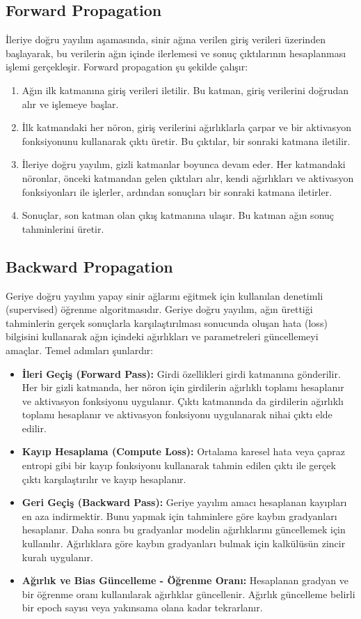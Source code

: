 \subsection{Forward Propagation}
İleriye doğru yayılım aşamasında, sinir ağına verilen giriş verileri üzerinden başlayarak, bu verilerin ağın içinde ilerlemesi ve sonuç çıktılarının hesaplanması işlemi gerçekleşir. Forward propagation şu şekilde çalışır:
\begin{enumerate}
    \item Ağın ilk katmanına giriş verileri iletilir. Bu katman, giriş verilerini doğrudan alır ve işlemeye başlar.
    \item İlk katmandaki her nöron, giriş verilerini ağırlıklarla çarpar ve bir aktivasyon fonksiyonunu kullanarak çıktı üretir. Bu çıktılar, bir sonraki katmana iletilir.
    \item İleriye doğru yayılım, gizli katmanlar boyunca devam eder. Her katmandaki nöronlar, önceki katmandan gelen çıktıları alır, kendi ağırlıkları ve aktivasyon fonksiyonları ile işlerler, ardından sonuçları bir sonraki katmana iletirler.
    \item Sonuçlar, son katman olan çıkış katmanına ulaşır. Bu katman ağın sonuç tahminlerini üretir.
\end{enumerate}

\subsection{Backward Propagation}
Geriye doğru yayılım yapay sinir ağlarını eğitmek için kullanılan denetimli (supervised) öğrenme algoritmasıdır. Geriye doğru yayılım, ağın ürettiği tahminlerin gerçek sonuçlarla karşılaştırılması sonucunda oluşan hata (loss) bilgisini kullanarak ağın içindeki ağırlıkları ve parametreleri güncellemeyi amaçlar.  Temel adımları şunlardır:
\begin{itemize}
	\item \textbf{İleri Geçiş (Forward Pass):} Girdi özellikleri girdi katmanına gönderilir. Her bir gizli katmanda, her nöron için girdilerin ağırlıklı toplamı hesaplanır ve aktivasyon fonksiyonu uygulanır. Çıktı katmanında da girdilerin ağırlıklı toplamı hesaplanır ve aktivasyon fonksiyonu uygulanarak nihai çıktı elde edilir.
	\item \textbf{Kayıp Hesaplama (Compute Loss):} Ortalama karesel hata veya çapraz entropi gibi bir kayıp fonksiyonu kullanarak tahmin edilen çıktı ile gerçek çıktı karşılaştırılır ve kayıp hesaplanır.
	\item \textbf{Geri Geçiş (Backward Pass):} Geriye yayılım amacı hesaplanan kayıpları en aza indirmektir. Bunu yapmak için tahminlere göre kaybın gradyanları hesaplanır. Daha sonra bu gradyanlar modelin ağırlıklarını güncellemek için kullanılır. Ağırlıklara göre kaybın gradyanları bulmak için kalkülüsün zincir kuralı uygulanır.
	\item \textbf{Ağırlık ve Bias Güncelleme - Öğrenme Oranı:} Hesaplanan gradyan ve bir öğrenme oranı kullanılarak ağırlıklar güncellenir. Ağırlık güncelleme belirli bir epoch sayısı veya yakınsama olana kadar tekrarlanır.
\end{itemize}


